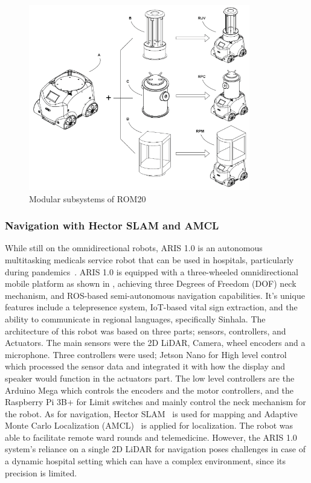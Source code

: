 \begin{figure}[H]
    \centering
    \includegraphics[width=3.8in ]{pics/modular_rom20.png}
    \caption[Modular sybsystems of ROM20]{Modular subsystems of ROM20~\cite{baskoro2020autonomous}}\label{bask}
\end{figure}

\subsubsection{Navigation with Hector SLAM and AMCL}
\noindent While still on the omnidirectional robots, ARIS 1.0 is an autonomous multitasking medicals service
robot that can be used in hospitals, particularly during pandemics~\cite{dunuwila2024aris}. ARIS 1.0 is equipped with a three-wheeled
omnidirectional mobile platform as shown in , achieving three Degrees of Freedom (DOF) neck mechanism, and ROS-based
semi-autonomous navigation capabilities. It's unique features include a telepresence system, IoT-based
vital sign extraction, and the ability to communicate in regional languages, specifically Sinhala. The architecture of this robot was based on three parts; sensors, controllers, and Actuators. The main sensors were the 2D LiDAR, Camera, wheel encoders and a microphone. Three controllers were used; Jetson Nano for High level control which processed the sensor data and integrated it with how the display and speaker would 
function in the actuators part. The low level controllers are the Arduino Mega which controls the encoders and the motor controllers, 
and the Raspberry Pi 3B+ for Limit switches and mainly control the neck mechanism for the robot. As for navigation, Hector SLAM~\cite{nagla2020hector} is used for mapping and Adaptive Monte Carlo Localization (AMCL)~\cite{chung2022improved} is
applied for localization.
The robot was able to facilitate remote ward rounds and telemedicine. However, the ARIS 1.0 system's reliance on a
single 2D LiDAR for navigation poses challenges in case of a dynamic hospital setting which can have a complex
environment, since its precision is limited. 



